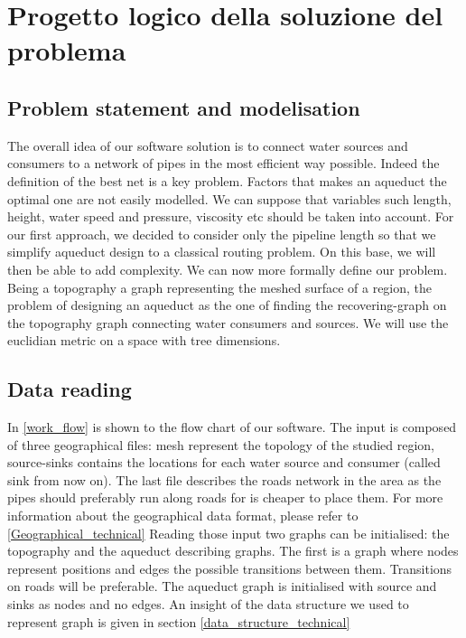 \chapter{Progetto logico della soluzione del problema}
\label{capitolo4}
\thispagestyle{empty}

\section{Problem statement and modelisation}
The overall idea of our software solution is to connect water sources and consumers to a network of pipes in the most efficient way possible. Indeed the definition of the best net is a key problem. Factors that makes an aqueduct the optimal one are not easily modelled. We can suppose that variables such length, height, water speed and pressure, viscosity etc should be taken into account.
\hfill For our first approach, we decided to consider only the pipeline length so that we simplify aqueduct design to a classical routing problem. On this base, we will then be able to add complexity.
\hfill We can now more formally define our problem. Being a topography a graph representing the meshed surface of a region, the problem of designing an aqueduct as the one of finding the recovering-graph on the topography graph connecting water consumers and sources. We will use the euclidian metric on a space with tree dimensions.



\section{Data reading}
In \ref {work_flow} is shown to the flow chart of our software. 
The input is composed of three geographical files: mesh represent the topology of the studied region, source-sinks contains the locations for each water source and consumer (called sink from now on). The last file describes the roads network in the area as the pipes should preferably run along roads for is cheaper to place them. For more information about the geographical data format, please refer to \ref{Geographical_technical}
Reading those input two graphs can be initialised: the topography and the aqueduct describing graphs. The first is a graph where nodes represent positions and edges the possible transitions between them. Transitions on roads will be preferable. The aqueduct graph is initialised with source and sinks as nodes and no edges. An insight of the data structure we used to represent graph is given in section \ref {data_structure_technical}

